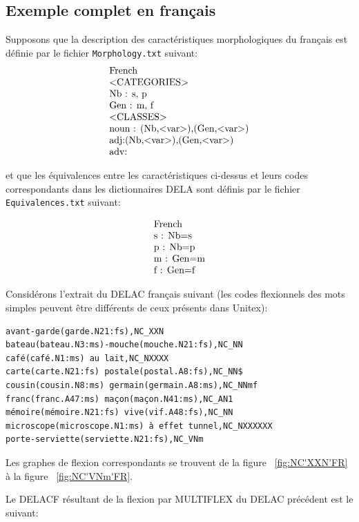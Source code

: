 \subsection{Exemple complet en français}
Supposons que la description des caractéristiques morphologiques du français est définie par le
fichier \verb+Morphology.txt+ suivant:
\[
\begin{array}[l]{l}
$French$ \\
$<CATEGORIES>$ \\
$Nb : s, p$ \\
$Gen : m, f$ \\
$<CLASSES>$ \\
$noun : (Nb,<var>),(Gen,<var>)$ \\
$adj:(Nb,<var>),(Gen,<var>)$ \\
$adv:$
\end{array}
\]

\bigskip
\noindent et que les équivalences entre les caractéristiques ci-dessus et leurs codes correspondants
dans les dictionnaires DELA sont définis par le fichier \verb+Equivalences.txt+ suivant:

\[
\begin{array}[l]{l}
$French$ \\
$s : Nb=s$ \\
$p : Nb=p$ \\
$m : Gen=m$ \\
$f : Gen=f$
\end{array}
\]

\bigskip
\noindent Considérons l'extrait du DELAC français suivant (les codes flexionnels des mots simples
peuvent être différents de ceux présents dans Unitex):

\begin{verbatim}
avant-garde(garde.N21:fs),NC_XXN
bateau(bateau.N3:ms)-mouche(mouche.N21:fs),NC_NN
café(café.N1:ms) au lait,NC_NXXXX
carte(carte.N21:fs) postale(postal.A8:fs),NC_NN$
cousin(cousin.N8:ms) germain(germain.A8:ms),NC_NNmf
franc(franc.A47:ms) maçon(maçon.N41:ms),NC_AN1
mémoire(mémoire.N21:fs) vive(vif.A48:fs),NC_NN
microscope(microscope.N1:ms) à effet tunnel,NC_NXXXXXX
porte-serviette(serviette.N21:fs),NC_VNm
\end{verbatim}


\bigskip
\noindent Les graphes de flexion correspondants se trouvent de la figure ~\ref{fig:NC'XXN'FR} à la
figure ~\ref{fig:NC'VNm'FR}. 

\bigskip
\noindent Le DELACF résultant de la flexion par MULTIFLEX du DELAC précédent est le suivant:


